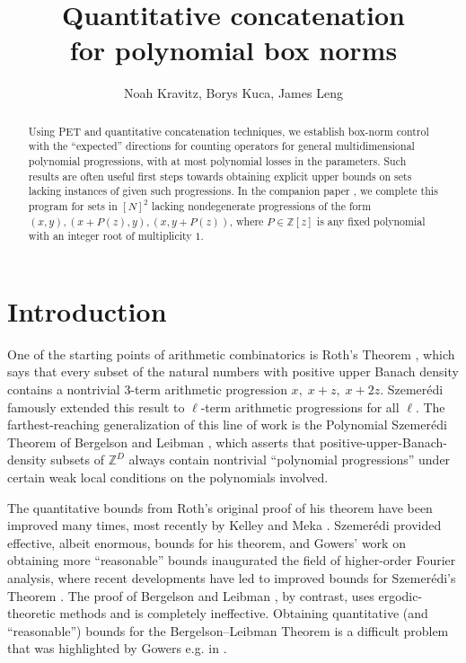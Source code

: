 \documentclass[11pt]{amsart}
\title[]{Quantitative concatenation\\ for polynomial box norms}
\author{Noah Kravitz, Borys Kuca, James Leng}
\date{}
\theoremstyle{definition}
\newcommand{\Z}{{\mathbb Z}}
\begin{document}
\begin{abstract}
Using PET and quantitative concatenation techniques, we establish box-norm control with the ``expected'' directions for counting operators for general multidimensional polynomial progressions, with at most polynomial losses in the parameters.  Such results are often useful first steps towards obtaining explicit upper bounds on sets lacking instances of given such progressions.  In the companion paper \cite{KKL24b}, we complete this program for sets in $[N]^2$ lacking nondegenerate progressions of the form $(x, y), (x + P(z), y), (x, y + P(z))$, where $P \in \mathbb{Z}[z]$ is any fixed polynomial with an integer root of multiplicity $1$.
\end{abstract}

\maketitle



\section{Introduction}



One of the starting points of arithmetic combinatorics is Roth's Theorem \cite{R53}, which says that every subset of the natural numbers with positive upper Banach density contains a nontrivial $3$-term arithmetic progression $x,\; x+z,\; x+2z$.  Szemer\'edi \cite{Sz75} famously extended this result to $\ell$-term arithmetic progressions for all $\ell$.  The farthest-reaching generalization of this line of work is the Polynomial Szemer\'edi Theorem of Bergelson and Leibman \cite{BL96}, which asserts that positive-upper-Banach-density subsets of $\Z^D$ always contain nontrivial ``polynomial progressions'' under certain weak local conditions on the polynomials involved.

The quantitative bounds from Roth's original proof of his theorem have been improved many times, most recently by Kelley and Meka \cite{KM23}.  Szemer\'edi provided effective, albeit enormous, bounds for his theorem, and Gowers' work \cite{Go01} on obtaining more ``reasonable'' bounds inaugurated the field of higher-order Fourier analysis, where recent developments have led to improved bounds for Szemer\'edi's Theorem \cite{LSS24b}.  The proof of Bergelson and Leibman \cite{BL96}, by contrast, uses ergodic-theoretic methods and is completely ineffective.  Obtaining quantitative (and ``reasonable'') bounds for the Bergelson--Leibman Theorem is a difficult problem that was highlighted by Gowers e.g. in \cite{Go98b}.
\end{document}
